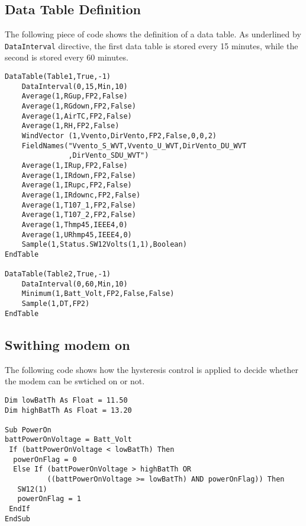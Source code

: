 \subsection{Data Table Definition}
The following piece of code shows the definition of a data table.
As underlined by {\tt DataInterval} directive, the first data table is stored every 15 minutes, while the second is stored every 60 minutes.
\begin{lstlisting}
DataTable(Table1,True,-1)
	DataInterval(0,15,Min,10)
	Average(1,RGup,FP2,False)
	Average(1,RGdown,FP2,False)
	Average(1,AirTC,FP2,False)
	Average(1,RH,FP2,False)
	WindVector (1,Vvento,DirVento,FP2,False,0,0,2)
	FieldNames("Vvento_S_WVT,Vvento_U_WVT,DirVento_DU_WVT
	           ,DirVento_SDU_WVT")
	Average(1,IRup,FP2,False)
	Average(1,IRdown,FP2,False)
	Average(1,IRupc,FP2,False)
	Average(1,IRdownc,FP2,False)
	Average(1,T107_1,FP2,False)
	Average(1,T107_2,FP2,False)
	Average(1,Thmp45,IEEE4,0)
	Average(1,URhmp45,IEEE4,0)
	Sample(1,Status.SW12Volts(1,1),Boolean)
EndTable

DataTable(Table2,True,-1)
	DataInterval(0,60,Min,10)
	Minimum(1,Batt_Volt,FP2,False,False)
	Sample(1,DT,FP2)
EndTable
\end{lstlisting}
\clearpage
\subsection{Swithing modem on}
The following code shows how the hysteresis control is applied to decide whether the modem can be swtiched on or not.
\begin{lstlisting}
Dim lowBatTh As Float = 11.50
Dim highBatTh As Float = 13.20

Sub PowerOn
battPowerOnVoltage = Batt_Volt
 If (battPowerOnVoltage < lowBatTh) Then
  powerOnFlag = 0
  Else If (battPowerOnVoltage > highBatTh OR 
          ((battPowerOnVoltage >= lowBatTh) AND powerOnFlag)) Then
   SW12(1)
   powerOnFlag = 1
 EndIf
EndSub
\end{lstlisting}
